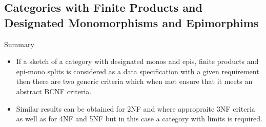 \subsection{Categories with Finite Products and Designated Monomorphisms and Epimorphims}


\begin{frame}{Summary}
\begin{itemize}
\item If a sketch of a category with designated monos and epis, finite products and epi-mono splits is
 considered as a data specification with a given requirement then there are  two generic criteria which when met
 ensure that it meets an abstract BCNF criteria.
\item Similar results can be obtained for 2NF and where appropraite 3NF criteria as well as for 4NF and 5NF but in this case a category with limits is required.
\end{itemize}
\end{frame}
\fi



\iffalse
\subsection{Entity-Relationship Notation}

\fi

\iffalse
\subsection{Unused}

\fi

